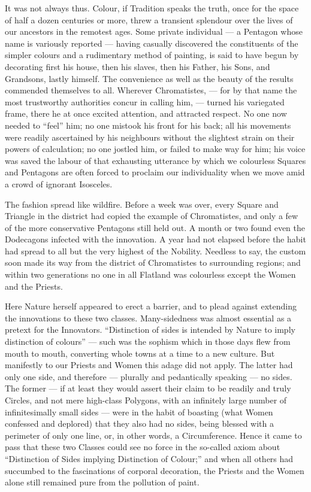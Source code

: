 \documentclass[12pt, a4paper, twoside]{memoir}
\begin{document}
It was not always thus. Colour, if Tradition speaks the truth, once for the
space of half a dozen centuries or more, threw a transient splendour over the
lives of our ancestors in the remotest ages. Some private individual --- a
Pentagon whose name is variously reported --- having casually discovered the
constituents of the simpler colours and a rudimentary method of painting, is
said to have begun by decorating first his house, then his slaves, then his
Father, his Sons, and Grandsons, lastly himself. The convenience as well as
the beauty of the results commended themselves to all. Wherever Chromatistes,
--- for by that name the most trustworthy authorities concur in calling him, ---
turned his variegated frame, there he at once excited attention, and attracted
respect. No one now needed to ``feel'' him; no one mistook his front for his
back; all his movements were readily ascertained by his neighbours without the
slightest strain on their powers of calculation; no one jostled him, or failed
to make way for him; his voice was saved the labour of that exhausting
utterance by which we colourless Squares and Pentagons are often forced to
proclaim our individuality when we move amid a crowd of ignorant Isosceles.

The fashion spread like wildfire. Before a week was over, every Square and
Triangle in the district had copied the example of Chromatistes, and only a
few of the more conservative Pentagons still held out. A month or two found
even the Dodecagons infected with the innovation. A year had not elapsed
before the habit had spread to all but the very highest of the Nobility.
Needless to say, the custom soon made its way from the district of
Chromatistes to surrounding regions; and within two generations no one in all
Flatland was colourless except the Women and the Priests.

Here Nature herself appeared to erect a barrier, and to plead against
extending the innovations to these two classes. Many-sidedness was almost
essential as a pretext for the Innovators. ``Distinction of sides is intended
by Nature to imply distinction of colours'' --- such was the sophism which in
those days flew from mouth to mouth, converting whole towns at a time to a new
culture. But manifestly to our Priests and Women this adage did not apply. The
latter had only one side, and therefore --- plurally and pedantically speaking ---
no sides. The former --- if at least they would assert their claim to be readily
and truly Circles, and not mere high-class Polygons, with an infinitely large
number of infinitesimally small sides --- were in the habit of boasting (what
Women confessed and deplored) that they also had no sides, being blessed with
a perimeter of only one line, or, in other words, a Circumference. Hence it
came to pass that these two Classes could see no force in the so-called axiom
about ``Distinction of Sides implying Distinction of Colour;'' and when all
others had succumbed to the fascinations of corporal decoration, the Priests
and the Women alone still remained pure from the pollution of paint.
\end{document}
